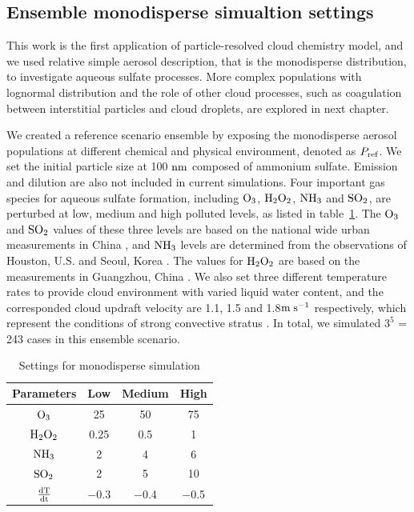 \documentclass[edeposit,fullpage]{uiucthesis2009}
\makeatletter
\DeclareRobustCommand*\unit[1]
 {\ensuremath{%
   {\thinmuskip3mu\relax
    \def\mu{\text{\textmu}}\def~{\,}%
    \ifx\f@series\testbx\mathbf{#1}\else\mathrm{#1}\fi}}}
\makeatother
\begin{document}
\subsection{Ensemble monodisperse simualtion settings}
This work is the first application of particle-resolved cloud chemistry model, and we used relative simple aerosol description, that is the monodisperse distribution, to investigate aqueous sulfate processes. More complex populations with lognormal distribution and the role of other cloud processes, such as coagulation between interstitial particles and cloud droplets, are explored in next chapter. 

We created a reference scenario ensemble by exposing the monodisperse aerosol populations at different chemical and physical environment, denoted as
$P_{\rm ref}$. We set the initial particle size at 100 \unit{nm} composed of ammonium sulfate. Emission and dilution are also not included in current simulations. Four important gas species for aqueous sulfate formation, including $\rm O_3$, $\rm H_2O_2$, $\rm NH_3$ and $\rm SO_2$, are perturbed at low, medium and high polluted levels, as listed in table~\ref{TMI-setting}. The $\rm O_3$ and $\rm SO_2$ values of these three levels are based on the national wide urban measurements in China \citep{wang2014spatial}, and $\rm NH_3$ levels are determined from the observations of Houston, U.S. \citep{nowak2010airborne} and Seoul, Korea \citep{phan2013analysis}. The values for $\rm H_2O_2$ are based on the measurements in Guangzhou, China \citep{hua2008atmospheric}. We also set three different temperature rates to provide cloud environment with varied liquid water content, and the corresponded cloud updraft velocity are 1.1, 1.5 and 1.8\unit{m\;s^{-1}} respectively, which represent the conditions of strong convective stratus \citep{peng2005importance}. In total, we simulated $3^5$ = 243 cases in this ensemble scenario.

\begin{table}[ht]
\centering
\caption{Settings for monodisperse simulation}
\label{TMI-setting}
\begin{tabular}{c  c c  c}
\hline
Parameters & Low  & Medium & High\\
\hline
$\rm O_3$& 25 & 50 & 75 \\
$\rm H_2O_2$& 0.25 & 0.5 &  1\\
$\rm NH_3$ &2 & 4 & 6 \\
$\rm SO_2$&2&5& 10\\
$\rm \frac{dT}{dt}$ &$-$0.3 &$ -$0.4&$-$0.5\\
\hline
\end{tabular}
\end{table}
\end{document}
